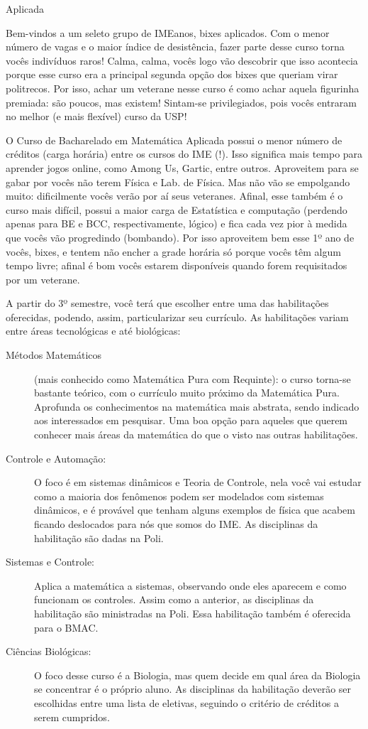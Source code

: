 \begin{subsecao}{Aplicada}

Bem-vindos a um seleto grupo de IMEanos, bixes aplicados. Com o menor número de
vagas e o maior índice de desistência, fazer parte desse curso torna vocês
indivíduos raros!  Calma, calma, vocês logo vão descobrir que isso acontecia
porque esse curso era a principal segunda opção dos bixes que queriam virar
politrecos. Por isso, achar um veterane nesse curso é como achar aquela
figurinha premiada: são poucos, mas existem! Sintam-se privilegiados, pois vocês
entraram no melhor (e mais flexível) curso da USP!

O Curso de Bacharelado em Matemática Aplicada possui o menor número de créditos
(carga horária) entre os cursos do IME (!). Isso significa mais tempo para
aprender jogos online, como Among Us, Gartic, entre outros.   
Aproveitem para se gabar por vocês não terem Física e
Lab. de Física. Mas não vão se empolgando muito: dificilmente vocês verão por aí
seus veteranes. Afinal, esse também é o curso mais difícil, possui a maior carga
de Estatística e computação (perdendo apenas para BE e BCC, respectivamente,
lógico) e fica cada vez pior à medida que vocês vão progredindo (bombando). Por
isso aproveitem bem esse 1º ano de vocês, bixes, e tentem não encher a grade
horária só porque vocês têm algum tempo livre; afinal é bom vocês estarem
disponíveis quando forem requisitados por um veterane.

A partir do 3º semestre, você terá que escolher entre uma das habilitações
oferecidas, podendo, assim, particularizar seu currículo. As habilitações variam
entre áreas tecnológicas e até biológicas:
\begin{description}
\item [Métodos Matemáticos] (mais conhecido como Matemática Pura com Requinte):
  o curso torna-se bastante teórico, com o currículo muito próximo da Matemática
  Pura. Aprofunda os conhecimentos na matemática mais abstrata, sendo indicado
  aos interessados em pesquisar. Uma boa opção para aqueles que querem conhecer
  mais áreas da matemática do que o visto nas outras habilitações.
\item [Controle e Automação:]  O foco é em sistemas dinâmicos e Teoria de
  Controle, nela você vai estudar como a maioria dos fenômenos podem ser
  modelados com sistemas dinâmicos, e é provável que tenham alguns exemplos de
  física que acabem ficando deslocados para nós que somos do IME. As disciplinas
  da habilitação são dadas na Poli.
\item [Sistemas e Controle:] Aplica a matemática a sistemas, observando onde
  eles aparecem e como funcionam os controles. Assim como a anterior, as
  disciplinas da habilitação são ministradas na Poli. Essa habilitação também é
  oferecida para o BMAC.
\item [Ciências Biológicas:] O foco desse curso é a Biologia, mas quem decide em
  qual área da Biologia se concentrar é o próprio aluno. As disciplinas da
  habilitação deverão ser escolhidas entre uma lista de eletivas, seguindo o
  critério de créditos a serem cumpridos.
\end{description}


\end{subsecao}
